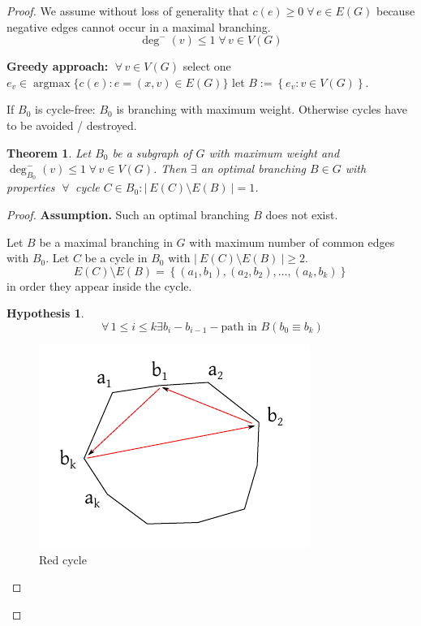 \documentclass{article}
\newtheorem{theorem}{Theorem}
\newtheorem*{hypothesis}{Hypothesis}
\newcommand{\card}[1]{\left|\:\!#1\:\!\right|}
\newcommand{\set}[1]{\left\{#1\right\}}
\newcommand{\fall}{\;\forall\,}
\DeclareMathOperator{\argmax}{argmax}
\begin{document}
\begin{proof}
We assume without loss of generality that $c(e) \geq 0 \fall e \in E(G)$ because negative edges cannot occur in a maximal branching.
\[
    \deg^-(v) \leq 1 \fall v \in V(G)
\]

\textbf{Greedy approach:} $\fall v \in V(G)$ select one $e_v \in \argmax\{c(e): e = (x, v) \in E(G)\}$ let $B := \set{e_v: v \in V(G)}$.

If $B_0$ is cycle-free: $B_0$ is branching with maximum weight. Otherwise cycles have to be avoided / destroyed.

\begin{theorem}\label{lemma-2.10}
  Let $B_0$ be a subgraph of $G$ with maximum weight and $\deg^-_{B_0}(v) \leq 1 \fall v \in V(G)$.
  Then $\exists$ an optimal branching $B \in G$ with properties $\fall$ cycle $C \in B_0: \card{E(C) \setminus E(B)} = 1$.
\end{theorem}

\begin{proof}
\textbf{Assumption.}
  Such an optimal branching $B$ does not exist.

Let $B$ be a maximal branching in $G$ with maximum number of common edges with $B_0$. Let $C$ be a cycle in $B_0$ with $\card{E(C) \setminus E(B)} \geq 2$.
\[
  E(C) \setminus E(B) = \set{(a_1, b_1), (a_2, b_2), \ldots, (a_k, b_k)}
\]
in order they appear inside the cycle.

\begin{hypothesis}
  \[
    \fall 1 \leq i \leq k \exists b_i-b_{i-1}-\text{path in } B (b_0 \equiv b_k)
  \]
\end{hypothesis}

\begin{figure}[ht]
  \begin{center}
    \includegraphics{img/red_cycle.pdf}
    \caption{Red cycle}
  \end{center}
\end{figure}


\end{proof}
\end{proof}
\end{document}
